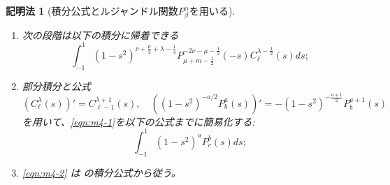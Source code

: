 \documentclass[12pt,a4paper,dvipdfmx]{jsarticle}
\numberwithin{equation}{section}
\theoremstyle{jplain}
\newtheorem{method}{記明法}
\theoremstyle{remark}
\theoremstyle{definition}
\begin{document}
{\begin{method}[積分公式とルジャンドル関数$ P^\alpha_\beta$を用いる]
\begin{enumerate}
{			\begin{equation*}
				\int_{-s}^1(s+t)^{2\nu} {C}_m^\mu(t)(1-t^2)^{\mu-\frac{1}{2}}dt=
				\frac{\sqrt{\pi}\Gamma(2\mu+m)\Gamma(2\nu+1)}{\Gamma(\mu)2^{\mu-\frac{1}{2}}m!}
				(1-s^2)^{\nu+\frac{\mu}{2}+\frac{1}{4}}P_{\mu+m-\frac{1}{2}}^{-2\nu-\mu-\frac{1}{2}}(-s).
			\end{equation*}
		}
		を用いる(ここで、$P_{\mu+m-\frac{1}{2}}^{-2\nu-\mu-\frac{1}{2}}(-s)$
		はルジャンドルの陪関数である);
		\item 次の段階は以下の積分に帰着できる
			\begin{equation}\label{eqn:m4-1}
				\int_{-1}^1(1-s^2)^{\nu+\frac{\mu}{2}+\lambda-\frac{1}{4}}P_{\mu+m-\frac{1}{2}}^{-2\nu-\mu-\frac{1}{2}}(-s)C^{\lambda-\frac{1}{2}}_\ell(s)ds;
			\end{equation}
			
		\item 部分積分と公式
			\begin{equation*}
				\left(C^\lambda_\ell(s)  \right)'=C^{\lambda+1}_{\ell-1}(s),\quad\left((1-s^2)^{-a/2}P^a_b(s) \right)'
			=-(1-s^2)^{-\frac{a+1}{2}}P_b^{a+1}(s)
			\end{equation*}
			を用いて、\eqref{eqn:m4-1}を以下の公式までに簡易化する:
			\begin{equation}\label{eqn:m4-2}
				\int_{-1}^1(1-s^2)^aP^b_c(s)ds;
			\end{equation}
			
		\item \eqref{eqn:m4-2} は \cite[L2]{kobayashi2011schrodinger}の積分公式から従う。
	\end{enumerate}
\end{method}
}
\end{document}
